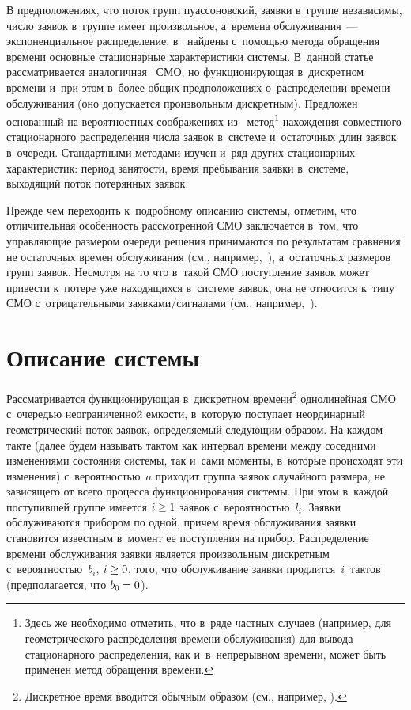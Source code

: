 \begin{multicols}{2}
В предположениях, что поток групп пуассоновский, заявки в~группе
независимы, число заявок в~группе имеет произвольное,
а~времена обслуживания~--- экспоненциальное распределение,
в~\cite{i1} найде\-ны с~помощью метода обращения времени основные 
стационарные характеристики сис\-те\-мы.
В~данной статье рассматривается аналогичная~\cite{i1} СМО, но 
функционирующая в~дискретном времени и~при этом
в~более общих предположениях о~распределении времени обслуживания (оно 
допускается произвольным дискретным).
Предложен основанный на вероятностных соображениях из~\cite{n4}
метод\footnote[4]{Здесь же необходимо отметить,
что в~ряде частных случаев (например, для геометрического
распределения времени обслуживания) для вывода стационарного 
распределения,
как и~в~непрерывном времени, может быть применен метод обращения 
времени.}
нахождения совместного стационарного распределения числа заявок в~системе 
и~остаточных длин заявок в~очереди.
Стандартными методами изучен и~ряд других стационарных характеристик: 
период занятости,
время пребывания заявки в~системе, выходящий поток потерянных заявок.

Прежде чем переходить к~подробному описанию системы, отметим, что 
отличительная особенность рассмотренной СМО заключается в~том, что 
управ\-ля\-ющие размером очереди решения принимаются по результатам
сравнения не остаточных времен обслуживания (см., например,~\cite{tata,i10,i11}), 
а~остаточных размеров групп заявок. Несмотря на то что в~такой СМО 
поступление заявок
может привести к~потере уже находящихся в~системе заявок,
она не относится к~типу СМО с~отрицательными за\-яв\-ка\-ми/сиг\-на\-ла\-ми 
(см., например,~\cite{i12}).



\section{Описание системы}

Рассматривается функционирующая в~дискретном времени\footnote{Дискретное 
время вводится обычным образом
(см., например, \cite{distime}).} однолинейная СМО
с~очередью неограни\-чен\-ной емкости,
в~которую поступает неординарный геометрический поток заявок,
определяемый следующим образом. На каждом такте
(далее будем называть тактом как интервал времени
между соседними изменениями состояния сис\-те\-мы, так
и~сами моменты, в~которые происходят эти изменения)
с~вероятностью~$a$ приходит
группа заявок случайного размера, не зависящего
от всего процесса функционирования сис\-те\-мы. При
этом в~каждой поступившей группе имеется $i\hm\ge 1$ заявок 
с~вероятностью~$l_i$. 
Заявки обслуживаются прибором по одной,
причем время обслуживания заявки становится известным
в~момент ее поступления на прибор.
Распределение времени обслуживания заявки является произвольным
дискретным с~вероятностью~$b_i$, $i\hm\ge0$, того, что
обслуживание заявки продлится~$i$~так\-тов (предполагается, что
$b_0\hm=0$).


\end{multicols}
